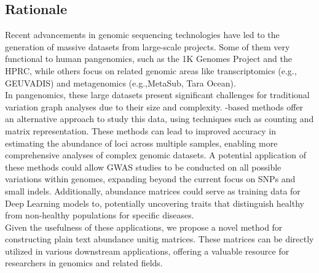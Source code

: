 \subsection{Rationale}
Recent advancements in genomic sequencing technologies have led to the generation of massive datasets from large-scale projects. Some of them very functional to human pangenomics, such as the 1K Genomes Project and the HPRC, while others focus on related genomic areas like transcriptomics (e.g., GEUVADIS) and metagenomics (e.g.,MetaSub, Tara Ocean).\\
In pangenomics, these large datasets present significant challenges for traditional variation graph analyses due to their size and complexity. \kmer-based methods offer an alternative approach to study this data, using techniques such as \kmer counting and matrix representation. These methods can lead to improved accuracy in estimating the abundance of loci across multiple samples, enabling more comprehensive analyses of complex genomic datasets. A potential application of these methods could allow GWAS studies to be conducted on all possible variations within genomes, expanding beyond the current focus on SNPs and small indels. Additionally, \kmer abundance matrices could serve as training data for Deep Learning models to, potentially uncovering traits that distinguish healthy from non-healthy populations for specific diseases.\\
Given the usefulness of these applications, we propose a novel method for constructing plain text abundance unitig matrices. These matrices can be directly utilized in various downstream applications, offering a valuable resource for researchers in genomics and related fields.

